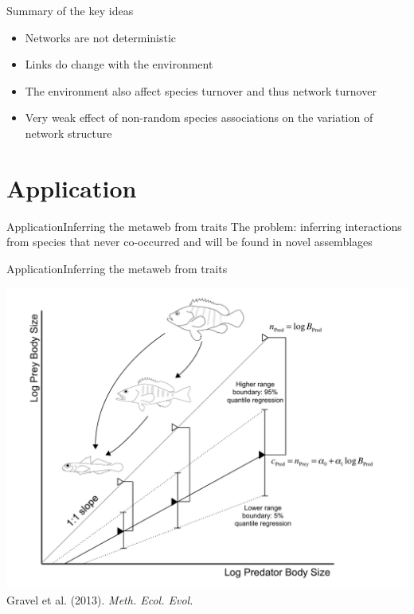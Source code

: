 \documentclass{eecslides}
\begin{document}

	\begin{frame}{Summary of the key ideas}
		\begin{itemize}
			\item Networks are not deterministic
			\item Links do change with the environment
			\item The environment also affect species turnover and thus network turnover
			\item Very weak effect of non-random species associations on the variation of network structure
		\end{itemize}
	\end{frame}

	\section{Application}

	\begin{frame}{Application}{Inferring the metaweb from traits}
	 The problem: inferring interactions from species that never co-occurred and will be found in novel assemblages 
	\end{frame}


	\begin{frame}{Application}{Inferring the metaweb from traits}
		\begin{center}
			\includegraphics[height=0.55\textheight]{fig_MEE}\\
			\footnotesize{Gravel et al. (2013). \textit{Meth. Ecol. Evol.}}
		\end{center}
	\end{frame}
\end{document}
